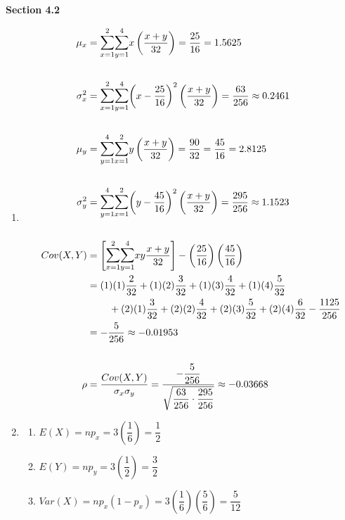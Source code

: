 \documentclass{article}
\newcommand\mfrac[2]{\left(\dfrac{#1}{#2}\right)}
\begin{document}
    \newpage
    \textbf{Section 4.2}
    \begin{enumerate}
     \item
      \begin{align*}
	 \mu_x &= \mathlarger{\sum}_{x=1}^2 \mathlarger{\sum}_{y=1}^4 {x\mfrac{x+y}{32}} 
	  = \dfrac{25}{16} = 1.5625 \\
	  \\
	 \sigma_x^2 &= \mathlarger{\sum}_{x=1}^2 \mathlarger{\sum}_{y=1}^4 
	      {\left(x-\dfrac{25}{16}\right)^2\mfrac{x+y}{32}}   
	  = \dfrac{63}{256} \approx 0.2461 \\
	  \\
	 \mu_y &= \mathlarger{\sum}_{y=1}^4 \mathlarger{\sum}_{x=1}^2 {y\mfrac{x+y}{32}} 
	  = \dfrac{90}{32} = \dfrac{45}{16} = 2.8125 \\
	  \\
	 \sigma_y^2 &= \mathlarger{\sum}_{y=1}^4 \mathlarger{\sum}_{x=1}^2
	      {\left(y-\dfrac{45}{16}\right)^2\left(\dfrac{x+y}{32}\right)}
	  = \dfrac{295}{256} \approx 1.1523 \\
	  \\
	 Cov(X,Y) &= \left[\mathlarger{\sum}_{x=1}^2 \mathlarger{\sum}_{y=1}^4 {xy \dfrac{x+y}{32}}\right] 
		- \mfrac{25}{16}\mfrac{45}{16} \\
	    &= (1)(1)\dfrac{2}{32} + (1)(2)\dfrac{3}{32} + (1)(3)\dfrac{4}{32} + (1)(4)\dfrac{5}{32} \\
	     &\mspace{40mu}+ (2)(1)\dfrac{3}{32} + (2)(2)\dfrac{4}{32} + (2)(3)\dfrac{5}{32} 
		+ (2)(4)\dfrac{6}{32} - \dfrac{1125}{256}\\
	    &= -\dfrac{5}{256} \approx -0.01953 \\
	  \\
	 \rho &= \dfrac{Cov(X,Y)}{\sigma_x\sigma_y} 
	    = \dfrac{-\dfrac{5}{256}}{\sqrt{\dfrac{63}{256}\cdot\dfrac{295}{256}}}
	    \approx -0.03668
      \end{align*}
     \addtocounter{enumi}{2}
     
     \newpage
     \item
      \begin{enumerate}
       \item $E(X) = np_x = 3\mfrac{1}{6} = \dfrac{1}{2}$
       
       \item $E(Y) = np_y = 3\mfrac{1}{2} = \dfrac{3}{2}$
       
       \item 
	$Var(X) = np_x(1-p_x) = 3\mfrac{1}{6}\mfrac{5}{6} = \dfrac{5}{12}$
       

\end{enumerate}
\end{enumerate}
\end{document}
